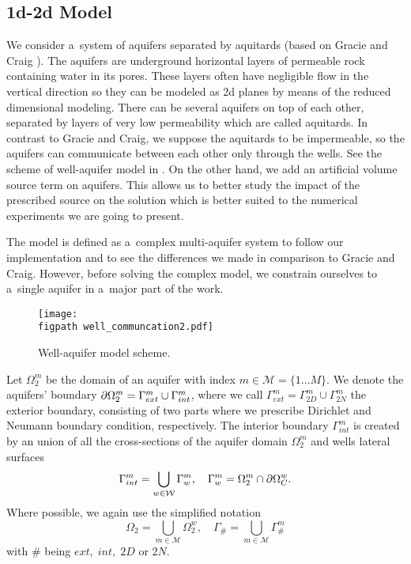 \subsection{1d-2d Model}
We consider a~system of aquifers separated by aquitards
(based on Gracie and Craig \cite{gracie_modelling_2010,craig_using_2011}).
The aquifers are underground horizontal layers of permeable rock containing water in its pores.
These layers often have negligible flow in the vertical direction so they can be modeled
as 2d planes by means of the reduced dimensional modeling.
There can be several aquifers on top of each other, separated by layers of very low permeability
which are called aquitards.
In contrast to Gracie and Craig, we suppose the aquitards to be impermeable, 
so the aquifers can communicate between each other only through the wells.
See the scheme of well-aquifer model in .
On the other hand, we add an artificial volume source term on aquifers.
This allows us to better study the impact of the prescribed source on the solution
which is better suited to the numerical experiments we are going to present. 

The model is defined as a~complex multi-aquifer system to follow our implementation and to see the differences
we made in comparison to Gracie and Craig. However, before solving the complex model,
we constrain ourselves to a~single aquifer in a~major part of the work.
%
\begin{figure}[!htb]
%     
  \begin{center}         
    \texttt{[image: \\figpath well\_communcation2.pdf]}
  \end{center}
  \caption{Well-aquifer model scheme.}
  \label{fig:well_flows}
\end{figure}

Let $\Omega^m_2$ be the domain of an aquifer with index $m\in\mathcal{M}=\{1\ldots M\}$.
We denote the aquifers' boundary $\partial\Omega^m_2 = \Gamma^m_{ext} \cup \Gamma^m_{int}$,
where we call $\Gamma^m_{ext} = \Gamma^m_{2D} \cup \Gamma^m_{2N}$ the exterior boundary, consisting of two parts where we prescribe
Dirichlet and Neumann boundary condition, respectively.
The interior boundary $\Gamma^m_{int}$ is created by an union of all the cross-sections of the aquifer domain $\Omega^m_2$
and wells lateral surfaces
\begin{equation}
    \Gamma^m_{int} = \bigcup_{\substack{w\in\mathcal{W}}} \Gamma^m_w, \quad \Gamma^m_w = \Omega^m_2 \cap \partial\Omega^w_C.
\end{equation}
Where possible, we again use the simplified notation
\begin{equation}
    \Omega_2 = \bigcup_{m\in\mathcal{M}} \Omega^w_2, \quad \Gamma_{\#} = \bigcup_{m\in\mathcal{M}} \Gamma^m_{\#}
\end{equation}
with $\#$ being $ext,\; int,\; 2D$ or $2N$.

